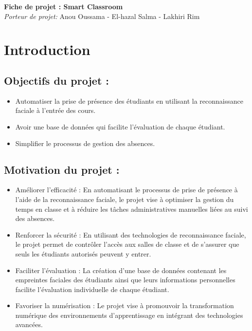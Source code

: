 \documentclass{article}
\begin{document}
	
	\begin{center}
		\vspace*{2cm}
		{\Huge\bfseries Fiche de projet : Smart Classroom} \\
		\vspace{0.5cm}
		\textit{Porteur de projet:} Anou Oussama - El-hazal Salma - Lakhiri Rim\\
		\vspace{1.5cm}
	\end{center}
	
	\section{Introduction}
	
	\subsection*{Objectifs du projet :}
	\begin{itemize}
		\item Automatiser la prise de présence des étudiants en utilisant la reconnaissance faciale à l'entrée des cours.
		\item Avoir une base de données qui facilite l'évaluation de chaque étudiant.
		\item Simplifier le processus de gestion des absences.
	\end{itemize}
	
	\subsection*{Motivation du projet :}
	\begin{itemize}
		\item Améliorer l'efficacité : En automatisant le processus de prise de présence à l'aide de la reconnaissance faciale, le projet vise à optimiser la gestion du temps en classe et à réduire les tâches administratives manuelles liées au suivi des absences.
		\item Renforcer la sécurité : En utilisant des technologies de reconnaissance faciale, le projet permet de contrôler l'accès aux salles de classe et de s'assurer que seuls les étudiants autorisés peuvent y entrer.
		\item Faciliter l'évaluation : La création d'une base de données contenant les empreintes faciales des étudiants ainsi que leurs informations personnelles facilite l'évaluation individuelle de chaque étudiant.
		\item Favoriser la numérisation : Le projet vise à promouvoir la transformation numérique des environnements d'apprentissage en intégrant des technologies avancées.
	\end{itemize}
	
\end{document}
